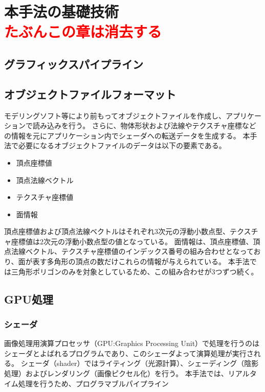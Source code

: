 \chapter{本手法の基礎技術\\ \textcolor{red}{ たぶんこの章は消去する}}
\label{CBasicmethod}



\section{グラフィックスパイプライン}
\label{SGraphicspipeline}

\section{オブジェクトファイルフォーマット}
\label{SObjfileformat}

モデリングソフト等により前もってオブジェクトファイルを作成し、アプリケーションで読み込みを行う。
さらに、物体形状および法線やテクスチャ座標などの情報を元にアプリケーション内でシェーダへの転送データを生成する。
本手法で必要になるオブジェクトファイルのデータは以下の要素である。

\begin{itemize}
\item 頂点座標値
\item 頂点法線ベクトル
\item テクスチャ座標値
\item 面情報
\end{itemize}

頂点座標値および頂点法線ベクトルはそれぞれ3次元の浮動小数点型、テクスチャ座標値は2次元の浮動小数点型の値となっている。
面情報は、頂点座標値、頂点法線ベクトル、テクスチャ座標値のインデックス番号の組み合わせとなっており、面が表す多角形の頂点の数だけこれらの情報が与えられている。
本手法では三角形ポリゴンのみを対象としているため、この組み合わせが3つずつ続く。

\section{GPU処理}
\label{SGpumethod}

\subsection{シェーダ}
\label{SSShader}
画像処理用演算プロセッサ（GPU:Graphics Processing Unit）で処理を行うのはシェーダとよばれるプログラムであり、このシェーダよって演算処理が実行される。
シェーダ（shader）ではライティング（光源計算）、シェーディング（陰影処理）およびレンダリング（画像ピクセル化）を行う。
本手法では、リアルタイム処理を行うため、プログラマブルパイプライン
